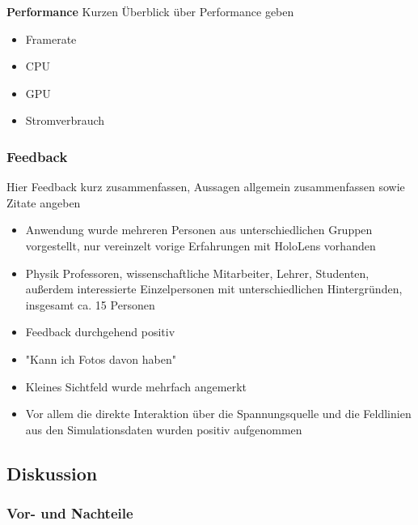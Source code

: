 \textbf{Performance}
Kurzen Überblick über Performance geben
\begin{itemize}
	\item Framerate
	\item CPU
	\item GPU
	\item Stromverbrauch
\end{itemize}


\subsubsection{Feedback}
Hier Feedback kurz zusammenfassen, Aussagen allgemein zusammenfassen sowie Zitate angeben
\begin{itemize}
	\item Anwendung wurde mehreren Personen aus unterschiedlichen Gruppen vorgestellt, nur vereinzelt vorige Erfahrungen mit HoloLens vorhanden
	\item Physik Professoren, wissenschaftliche Mitarbeiter, Lehrer, Studenten, außerdem interessierte Einzelpersonen mit unterschiedlichen Hintergründen, insgesamt ca. 15 Personen
	\item Feedback durchgehend positiv
	\item "Kann ich Fotos davon haben"
	\item Kleines Sichtfeld wurde mehrfach angemerkt
	\item Vor allem die direkte Interaktion über die Spannungsquelle und die Feldlinien aus den Simulationsdaten wurden positiv aufgenommen
\end{itemize}


\subsection{Diskussion}

\subsubsection{Vor- und Nachteile}
